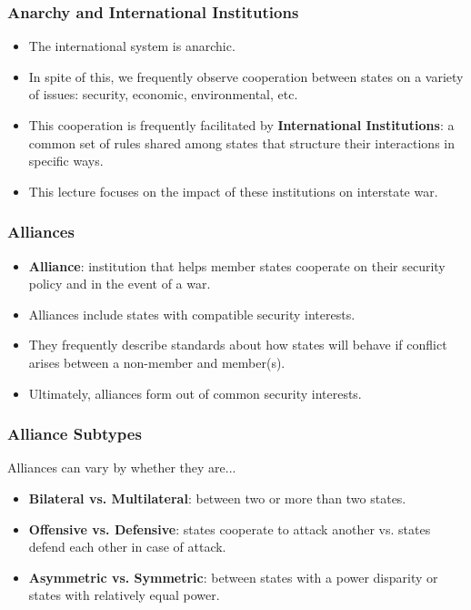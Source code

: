 \documentclass[handout]{beamer}
\begin{document}
\begin{frame} 
	\frametitle{\LARGE{Anarchy and International Institutions}}
	\begin{itemize}
		\item The international system is anarchic. \pause
		\item In spite of this, we frequently observe cooperation between states on a variety of issues: security, economic, environmental, etc.
		\item This cooperation is frequently facilitated by \textbf{International Institutions}: a common set of rules shared among states that structure their interactions in specific ways. \pause
		\item This lecture focuses on the impact of these institutions on interstate war.
	\end{itemize}
\end{frame}

\begin{frame} 
\frametitle{\LARGE{Alliances}}
	\begin{itemize}
		\item \textbf{Alliance}: institution that helps member states cooperate on their security policy and in the event of a war. \pause 
		\item Alliances include states with compatible security interests. \pause
		\item They frequently describe standards about how states will behave if conflict arises between a non-member and member(s). \pause
		\item Ultimately, alliances form out of common security interests.
	\end{itemize}
\end{frame}


\begin{frame} 
	\frametitle{\LARGE{Alliance Subtypes}}
Alliances can vary by whether they are...
	\begin{itemize}
		\item \textbf{Bilateral vs. Multilateral}: between two or more than two states. \pause
		\item\textbf{Offensive vs. Defensive}: states cooperate to attack another vs. states defend each other in case of attack. \pause
		\item \textbf{Asymmetric vs. Symmetric}: between states with a power disparity or states with relatively equal power.
	\end{itemize}
\end{frame}
\end{document}
